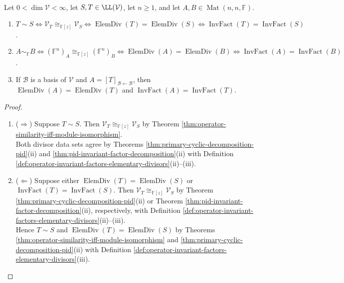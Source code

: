 \begin{theorem} \label{thm:elementary-divisors-complete-similarity-invariant} \\
Let $0<\dim\mathcal{V}<\infty$, let $S,T\in\LL(\mathcal{V})$, let $n\geq1$, and let $A,B\in\operatorname{Mat}(n,n,\mathbb{F})$.
\begin{enumerate}[label=(\roman*)]
\setlength{\itemsep}{0pt}
\item $T\sim S\Longleftrightarrow\mathcal{V}_T\cong_{\mathbb{F}[z]}\mathcal{V}_S\Longleftrightarrow\operatorname{ElemDiv}(T)=\operatorname{ElemDiv}(S)\Longleftrightarrow\operatorname{InvFact}(T)=\operatorname{InvFact}(S)$.
\item $A\sim_{\mathbb{F}}B\Longleftrightarrow(\mathbb{F}^n)_A\cong_{\mathbb{F}[z]}(\mathbb{F}^n)_B\Longleftrightarrow\operatorname{ElemDiv}(A)=\operatorname{ElemDiv}(B)\Longleftrightarrow\operatorname{InvFact}(A)=\operatorname{InvFact}(B)$.
\item If $\mathcal{B}$ is a basis of $\mathcal{V}$ and $A=[T]_{\mathcal{B}\leftarrow\mathcal{B}}$, then $\operatorname{ElemDiv}(A)=\operatorname{ElemDiv}(T)$ and $\operatorname{InvFact}(A)=\operatorname{InvFact}(T)$.
\end{enumerate}
\begin{proof}
\begin{enumerate}[label=(\roman*)]
\setlength{\itemsep}{0pt}
\item[$(i)$] ($\Rightarrow$) Suppose $T\sim S$. Then $\mathcal{V}_T\cong_{\mathbb{F}[z]}\mathcal{V}_S$ by Theorem \ref{thm:operator-similarity-iff-module-isomorphism}.\\
Both divisor data sets agree by Theorems \ref{thm:primary-cyclic-decomposition-pid}(ii) and \ref{thm:pid-invariant-factor-decomposition}(ii) with Definition \ref{def:operator-invariant-factors-elementary-divisors}(ii)--(iii).
\item[$(i)$] ($\Leftarrow$) Suppose either $\operatorname{ElemDiv}(T)=\operatorname{ElemDiv}(S)$ or $\operatorname{InvFact}(T)=\operatorname{InvFact}(S)$. Then $\mathcal{V}_T\cong_{\mathbb{F}[z]}\mathcal{V}_S$ by Theorem \ref{thm:primary-cyclic-decomposition-pid}(ii) or Theorem \ref{thm:pid-invariant-factor-decomposition}(ii), respectively, with Definition \ref{def:operator-invariant-factors-elementary-divisors}(ii)--(iii).\\
Hence $T\sim S$ and $\operatorname{ElemDiv}(T)=\operatorname{ElemDiv}(S)$ by Theorems \ref{thm:operator-similarity-iff-module-isomorphism} and \ref{thm:primary-cyclic-decomposition-pid}(ii) with Definition \ref{def:operator-invariant-factors-elementary-divisors}(iii).

\end{enumerate}
\end{proof}
\end{theorem}
